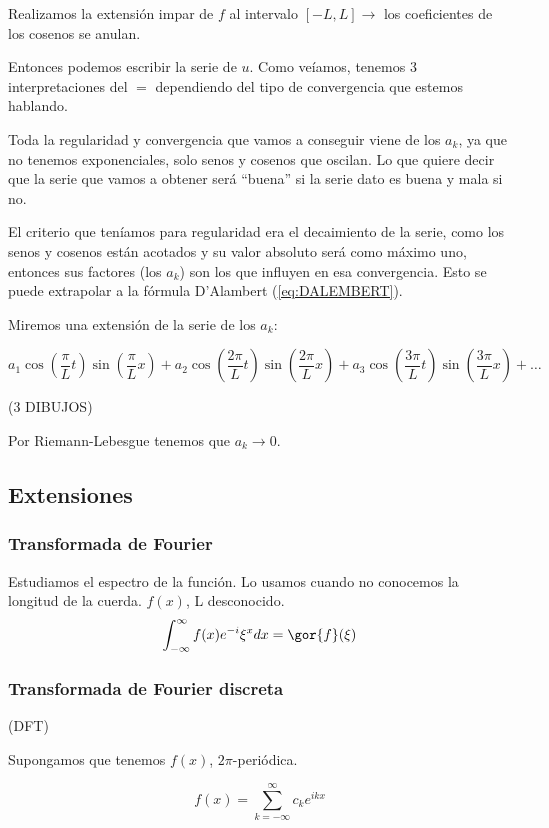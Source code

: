 			Realizamos la extensión impar de $f$ al intervalo $[-L,L] \rightarrow$ los coeficientes de los cosenos se anulan.

			Entonces podemos escribir la serie de $u$. Como veíamos, tenemos 3 interpretaciones del $=$ dependiendo del tipo de convergencia que estemos hablando.

			Toda la regularidad y convergencia que vamos a conseguir viene de los $a_k$, ya que no tenemos exponenciales, solo senos y cosenos que oscilan. Lo que quiere decir que la serie que vamos a obtener será ``buena'' si la serie dato es buena y mala si no.

			El criterio que teníamos para regularidad era el decaimiento de la serie, como los senos y cosenos están acotados y su valor absoluto será como máximo uno, entonces sus factores (los $a_k$) son los que influyen en esa convergencia. Esto se puede extrapolar a la fórmula D'Alambert (\ref{eq:DALEMBERT}).


			Miremos una extensión de la serie de los $a_k$:

			\[a_1 \cos\left(\frac{\pi}{L}t \right) \sin\left(\frac{\pi}{L}x \right) + a_2 \cos\left(\frac{2\pi}{L}t \right) \sin\left(\frac{2\pi}{L}x \right) + a_3 \cos\left(\frac{3\pi}{L}t \right) \sin\left(\frac{3\pi}{L}x \right) + …\]


			(3 DIBUJOS)


			Por Riemann-Lebesgue tenemos que $a_k \to 0$.

	\subsection{Extensiones}

		\subsubsection{Transformada de Fourier}
			Estudiamos el espectro de la función. Lo usamos cuando no conocemos la longitud de la cuerda.
					$f(x)$, L desconocido.
					\[\int_{-\infty}^\infty f(x) e^{-i} \xi^x dx = \gor{f} (\xi) \]

		\subsubsection{Transformada de Fourier discreta} (DFT)

			Supongamos que tenemos $f(x)$, $2\pi$-periódica.

			\[ f(x) = \sum_{k=-\infty}^\infty c_k e^{ikx}\]

